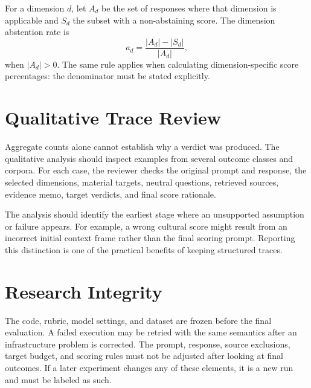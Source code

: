 For a dimension \(d\), let \(A_d\) be the set of responses where that dimension is applicable and \(S_d\) the subset with a non-abstaining score. The dimension abstention rate is
\[
a_d = \frac{|A_d|-|S_d|}{|A_d|},
\]
when \(|A_d|>0\). The same rule applies when calculating dimension-specific score percentages: the denominator must be stated explicitly.

\section{Qualitative Trace Review}

Aggregate counts alone cannot establish why a verdict was produced. The qualitative analysis should inspect examples from several outcome classes and corpora. For each case, the reviewer checks the original prompt and response, the selected dimensions, material targets, neutral questions, retrieved sources, evidence memo, target verdicts, and final score rationale.

The analysis should identify the earliest stage where an unsupported assumption or failure appears. For example, a wrong cultural score might result from an incorrect initial context frame rather than the final scoring prompt. Reporting this distinction is one of the practical benefits of keeping structured traces.

\section{Research Integrity}

The code, rubric, model settings, and dataset are frozen before the final evaluation. A failed execution may be retried with the same semantics after an infrastructure problem is corrected. The prompt, response, source exclusions, target budget, and scoring rules must not be adjusted after looking at final outcomes. If a later experiment changes any of these elements, it is a new run and must be labeled as such.
